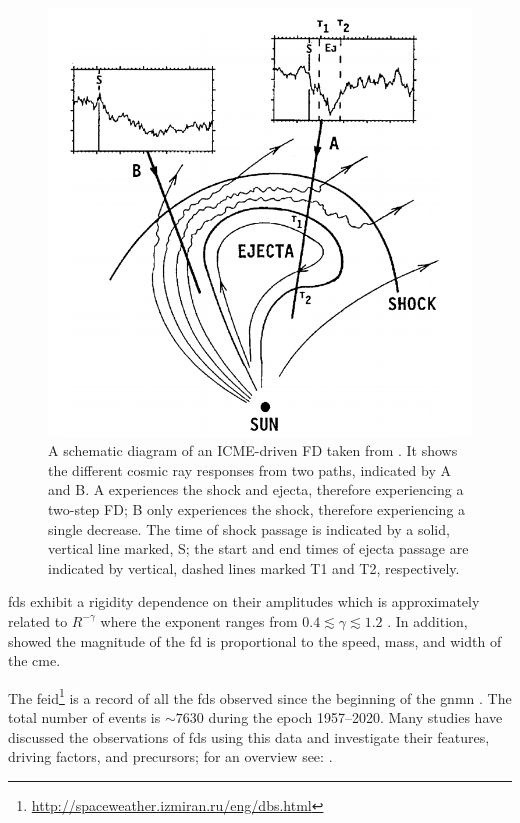 \begin{figure}[ht!]
	\centering
	\includegraphics[width=0.75\columnwidth]{FD_CME.png}
	\caption{A schematic diagram of an ICME-driven FD taken from \citet{cane_coronal_2000}. It shows the different cosmic ray responses from two paths, indicated by A and B. A experiences the shock and ejecta, therefore experiencing a two-step FD; B only experiences the shock, therefore experiencing a single decrease. The time of shock passage is indicated by a solid, vertical line marked, S; the start and end times of ejecta passage are indicated by vertical, dashed lines marked T1 and T2, respectively.}
	\label{fig:FD_CME}
\end{figure}

\glspl{fd} exhibit a rigidity dependence on their amplitudes which is approximately related to $R^{-\gamma}$ where the exponent ranges from $0.4\lesssim\gamma\lesssim1.2$ \citep{lockwood_forbush_1971}. In addition, \citet{belov_what_2001, belov_coronal_2014} showed the magnitude of the \gls{fd} is proportional to the speed, mass, and width of the \gls{cme}. 


The \gls{feid}\footnote{\url{http://spaceweather.izmiran.ru/eng/dbs.html}} is a record of all the \glspl{fd} observed since the beginning of the \gls{gnmn} \citep{belov_forbush_2008}. The total number of events is $\sim 7630$ during the epoch 1957--2020. Many studies have discussed the observations of \glspl{fd} using this data and investigate their features, driving factors, and precursors; for an overview see: \citet{belov_what_2001, usoskin_forbush_2008, wawrzynczak_modeling_2010, rockenbach_global_2014, arunbabu_how_2015}.



